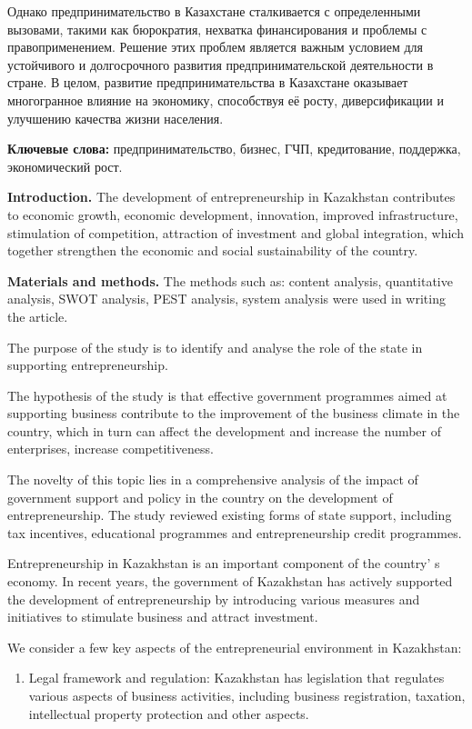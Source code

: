 Однако предпринимательство в Казахстане сталкивается с определенными
вызовами, такими как бюрократия, нехватка финансирования и проблемы с
правоприменением. Решение этих проблем является важным условием для
устойчивого и долгосрочного развития предпринимательской деятельности в
стране. В целом, развитие предпринимательства в Казахстане оказывает
многогранное влияние на экономику, способствуя её росту, диверсификации
и улучшению качества жизни населения.

{\bfseries Ключевые слова:} предпринимательство, бизнес, ГЧП, кредитование,
поддержка, экономический рост.
\begin{multicols}{2}

{\bfseries Introduction.} The development of entrepreneurship in
Kazakhstan contributes to economic growth, economic development,
innovation, improved infrastructure, stimulation of competition,
attraction of investment and global integration, which together
strengthen the economic and social sustainability of the country.

{\bfseries Materials and methods.} The methods such as: content analysis,
quantitative analysis, SWOT analysis, PEST analysis, system analysis
were used in writing the article.

The purpose of the study is to identify and analyse the role of the
state in supporting entrepreneurship.

The hypothesis of the study is that effective government programmes
aimed at supporting business contribute to the improvement of the
business climate in the country, which in turn can affect the
development and increase the number of enterprises, increase
competitiveness.

The novelty of this topic lies in a comprehensive analysis of the impact
of government support and policy in the country on the development of
entrepreneurship. The study reviewed existing forms of state support,
including tax incentives, educational programmes and entrepreneurship
credit programmes.

Entrepreneurship in Kazakhstan is an important component of the
country' s economy. In recent years, the government of
Kazakhstan has actively supported the development of entrepreneurship by
introducing various measures and initiatives to stimulate business and
attract investment.

We consider a few key aspects of the entrepreneurial environment in
Kazakhstan:

\begin{enumerate}
\def\labelenumi{\arabic{enumi}.}
\item
  Legal framework and regulation: Kazakhstan has legislation that
  regulates various aspects of business activities, including business
  registration, taxation, intellectual property protection and other
  aspects.


\end{enumerate}
\end{multicols}
